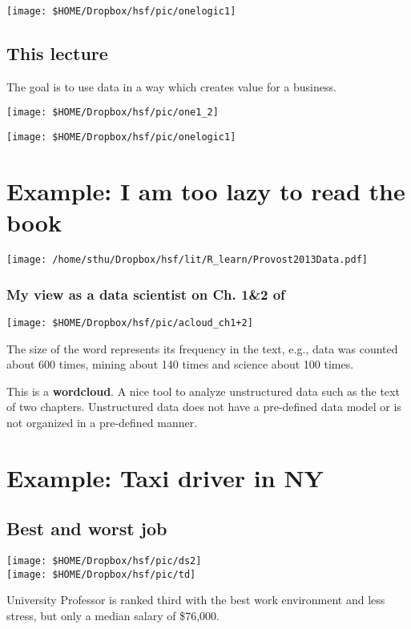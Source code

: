 \texttt{[image: \$HOME/Dropbox/hsf/pic/onelogic1]}

\pbn
\subsection*{This lecture}
The goal is to use data in a way which creates value for a business.
\begin{center}
	\texttt{[image: \$HOME/Dropbox/hsf/pic/one1\_2]}
\end{center}

\texttt{[image: \$HOME/Dropbox/hsf/pic/onelogic1]}


\section{Example: I am too lazy to read the book}
\begin{center}
	\citet{Provost2013Data}
	
	\texttt{[image: /home/sthu/Dropbox/hsf/lit/R\_learn/Provost2013Data.pdf]}
\end{center}

\subsubsection{My view as a data scientist on Ch. 1\&2 of \citet{Provost2013Data}}

\begin{center}
	\texttt{[image: \$HOME/Dropbox/hsf/pic/acloud\_ch1+2]}
\end{center}

The size of the word represents its frequency in the text, e.g., data was counted about 600 times, mining about 140 times and science about 100 times.

This is a \textbf{wordcloud}. A nice tool to analyze unstructured data such as the text of two chapters. Unstructured data does not have a pre-defined data model or is not organized in a pre-defined manner.

\section{Example: Taxi driver in NY}
\subsection{Best and worst job}
	\begin{center}
\texttt{[image: \$HOME/Dropbox/hsf/pic/ds2]}\\
\texttt{[image: \$HOME/Dropbox/hsf/pic/td]}
	\end{center}
University Professor is ranked third with the best work environment and less stress, but only a median salary of \$76,000.


